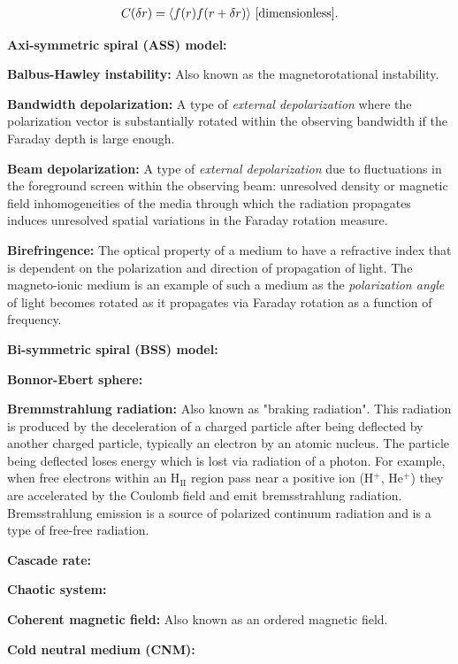 \documentclass[a4paper,11pt]{article}
\begin{document}
\begin{align*}
    C(\delta r) = \langle f(r)f(r+\delta r)\rangle ~ [{\rm dimensionless}].
\end{align*}

{\noindent}\textbf{Axi-symmetric spiral (ASS) model:}

{\noindent}\textbf{Balbus-Hawley instability:} Also known as the magnetorotational instability.

{\noindent}\textbf{Bandwidth depolarization:} A type of \textit{external depolarization} where the polarization vector is substantially rotated within the observing bandwidth if the Faraday depth is large enough.

{\noindent}\textbf{Beam depolarization:} A type of \textit{external depolarization} due to fluctuations in the foreground screen within the observing beam: unresolved density or magnetic field inhomogeneities of the media through which the radiation propagates induces unresolved spatial variations in the Faraday rotation measure.

{\noindent}\textbf{Birefringence:} The optical property of a medium to have a refractive index that is dependent on the polarization and direction of propagation of light. The magneto-ionic medium is an example of such a medium as the \textit{polarization angle} of light becomes rotated as it propagates via Faraday rotation as a function of frequency.

{\noindent}\textbf{Bi-symmetric spiral (BSS) model:}

{\noindent}\textbf{Bonnor-Ebert sphere:}

{\noindent}\textbf{Bremmstrahlung radiation:} Also known as "braking radiation". This radiation is produced by the deceleration of a charged particle after being deflected by another charged particle, typically an electron by an atomic nucleus. The particle being deflected loses energy which is lost via radiation of a photon. For example, when free electrons within an H$_\mathrm{II}$ region pass near a positive ion (H$^+$, He$^+$) they are accelerated by the Coulomb field and emit bremsstrahlung radiation. Bremsstrahlung emission is a source of polarized continuum radiation and is a type of free-free radiation.

{\noindent}\textbf{Cascade rate:}

{\noindent}\textbf{Chaotic system:}

{\noindent}\textbf{Coherent magnetic field:} Also known as an ordered magnetic field.

{\noindent}\textbf{Cold neutral medium (CNM):}
\end{document}
